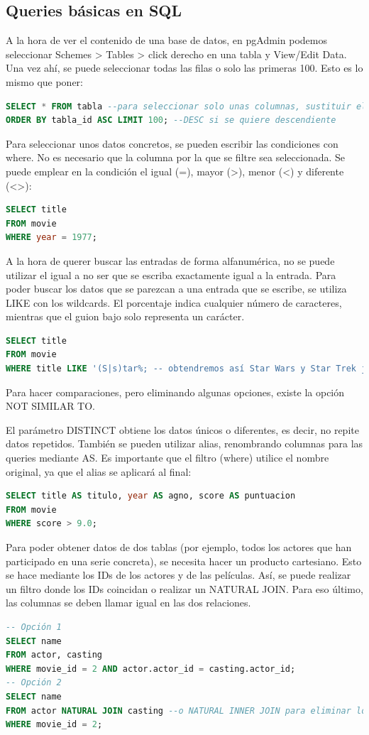 \subsection{Queries básicas en SQL}
A la hora de ver el contenido de una base de datos, en pgAdmin podemos seleccionar Schemes > Tables > click derecho en una tabla y View/Edit Data. Una vez ahí, se puede seleccionar todas las filas o solo las primeras 100. Esto es lo mismo que poner:
\begin{lstlisting}[language=SQL]
SELECT * FROM tabla --para seleccionar solo unas columnas, sustituir el asterisco por el nombre de las columnas
ORDER BY tabla_id ASC LIMIT 100; --DESC si se quiere descendiente
\end{lstlisting}
Para seleccionar unos datos concretos, se pueden escribir las condiciones con where. No es necesario que la columna por la que se filtre sea seleccionada. Se puede emplear en la condición el igual (=), mayor (>), menor (<) y diferente (<>):
\begin{lstlisting}[language=SQL]
SELECT title 
FROM movie 
WHERE year = 1977;
\end{lstlisting}
A la hora de querer buscar las entradas de forma alfanumérica, no se puede utilizar el igual a no ser que se escriba exactamente igual a la entrada. Para poder buscar los datos que se parezcan a una entrada que se escribe, se utiliza LIKE con los wildcards. El porcentaje indica cualquier número de caracteres, mientras que el guion bajo solo representa un carácter.
\begin{lstlisting}[language=SQL]
SELECT title 
FROM movie 
WHERE title LIKE '(S|s)tar%; -- obtendremos así Star Wars y Star Trek junto con películas que empiecen por star (en minúscula).
\end{lstlisting}
Para hacer comparaciones, pero eliminando algunas opciones, existe la opción NOT SIMILAR TO. 

El parámetro DISTINCT obtiene los datos únicos o diferentes, es decir, no repite datos repetidos. También se pueden utilizar alias, renombrando columnas para las queries mediante AS. Es importante que el filtro (where) utilice el nombre original, ya que el alias se aplicará al final: 
\begin{lstlisting}[language=SQL]
SELECT title AS titulo, year AS agno, score AS puntuacion
FROM movie
WHERE score > 9.0;
\end{lstlisting}

Para poder obtener datos de dos tablas (por ejemplo, todos los actores que han participado en una serie concreta), se necesita hacer un producto cartesiano. Esto se hace mediante los IDs de los actores y de las películas. Así, se puede realizar un filtro donde los IDs coincidan o realizar un NATURAL JOIN. Para eso último, las columnas se deben llamar igual en las dos relaciones.
\begin{lstlisting}[language=SQL]
-- Opción 1
SELECT name
FROM actor, casting
WHERE movie_id = 2 AND actor.actor_id = casting.actor_id;
-- Opción 2
SELECT name
FROM actor NATURAL JOIN casting --o NATURAL INNER JOIN para eliminar los datos nulos
WHERE movie_id = 2;
\end{lstlisting}

